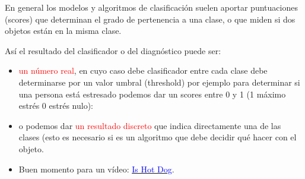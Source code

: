 \documentclass[handout]{beamer}\usepackage[]{graphicx}\usepackage[]{color}
\newcommand{\red}[1]{\textcolor{red}{#1}}
\newcommand{\blue}[1]{\textcolor{blue}{#1}}
\renewcommand{\emph}[1]{{\color{red}#1}}
\theoremstyle{plain}
\theoremstyle{definition}
\begin{document}
\begin{frame}
En general los  modelos y algoritmos de clasificación suelen aportar puntuaciones (\emph{scores}) que determinan el grado de pertenencia a  una clase, o que miden si dos objetos están en la misma clase.

Así  el resultado del clasificador o del diagnóstico  puede ser:

\begin{itemize}
\item \red{un número real}, en cuyo caso debe clasificador entre cada clase debe determinarse por un valor umbral  (\emph{threshold}) por ejemplo para determinar si una persona está estresado podemos dar un \emph{scores} entre 0 y 1 (1 máximo estrés 0 estrés nulo):
\item o podemos dar \red{un resultado discreto} que indica directamente una de las clases (esto es necesario si es un algoritmo que debe decidir  qué hacer con el objeto.
\item  Buen momento para un vídeo: \href{https://www.youtube.com/watch?v=pqTntG1RXSY}{\blue{Is Hot Dog}}. 

\end{itemize}
\end{frame}




% 
\end{document}
